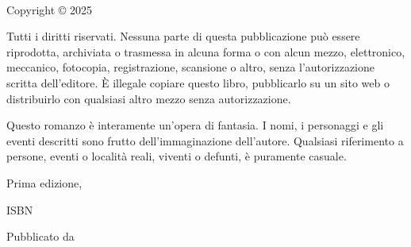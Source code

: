 
{\small
\setlength{\parindent}{0em}\setlength{\parskip}{1em}

~

\vfill

Copyright \copyright{} 2025 \authorname

Tutti i diritti riservati. Nessuna parte di questa pubblicazione può essere riprodotta, archiviata o trasmessa in alcuna forma o con alcun mezzo, elettronico, meccanico, fotocopia, registrazione, scansione o altro, senza l'autorizzazione scritta dell'editore. È illegale copiare questo libro, pubblicarlo su un sito web o distribuirlo con qualsiasi altro mezzo senza autorizzazione.

Questo romanzo è interamente un'opera di fantasia. I nomi, i personaggi e gli eventi descritti sono frutto dell'immaginazione dell'autore. Qualsiasi riferimento a persone, eventi o località reali, viventi o defunti, è puramente casuale.

Prima edizione, \editionyear{}

ISBN \isbn{}  %

Pubblicato da \publisher{}
}
